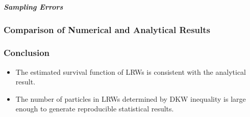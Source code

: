     \subparagraph{Sampling Errors}


  \subsubsection{Comparison of Numerical and Analytical Results}

  \subsubsection{Conclusion}
    \begin{itemize}
      \item The estimated survival function of LRWs is consistent with the analytical result.
      \item The number of particles in LRWs determined by DKW inequality is large enough to generate reproducible statistical results. 
    \end{itemize}
    
      

